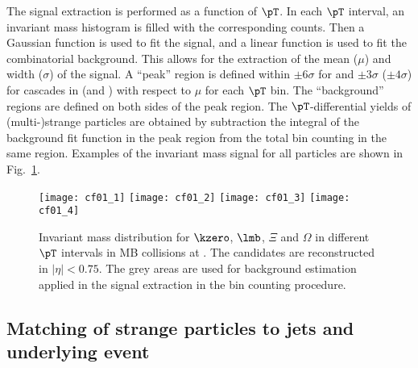 \documentclass[ALICE,manyauthors]{cernphprep}
\begin{document}
The signal extraction is performed as a function of $\pT$.
In each $\pT$ interval, an invariant mass histogram is filled with the corresponding counts.
Then a Gaussian function is used to fit the signal, and a linear function is used to fit the combinatorial background.
This allows for the extraction of the mean ($\mu$) and width ($\sigma$) of the signal.
A ``peak'' region is defined within $\pm 6\sigma$ for \Vzeros and $\pm 3\sigma$ ($\pm 4\sigma$) for cascades in \pp (and \pPb) with respect to $\mu$ for each $\pT$ bin.
The ``background'' regions are defined on both sides of the peak region.
The $\pT$-differential yields of (multi-)strange particles are obtained by subtraction the integral of the background fit function in the peak region from the total bin counting in the same region.
Examples of the invariant mass signal for all particles are shown in Fig.~\ref{fig:InvM}.
\begin{figure}[!ht]
	\begin{center}
		\texttt{[image: cf01\_1]}
		\texttt{[image: cf01\_2]}
		\texttt{[image: cf01\_3]}
		\texttt{[image: cf01\_4]}
		\caption{Invariant mass distribution for $\kzero$, $\lmb$, $\Xi$ and $\Omega$ in different $\pT$ intervals in MB \pPb collisions at \fivenn. The candidates are reconstructed in $|\eta|<0.75$.
			The grey areas are used for background estimation applied in the signal extraction in the bin counting procedure.}
		\label{fig:InvM}
	\end{center}
\end{figure}

\subsection{Matching of strange particles to jets and underlying event}%
\label{sec:ParJetMatch}
\end{document}
